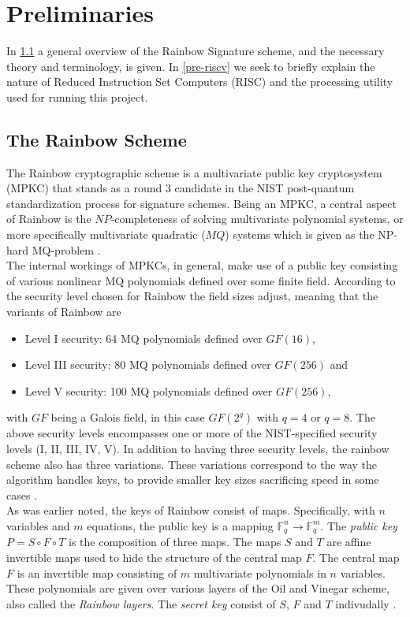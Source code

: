 \section{Preliminaries}
In \cref{rainscheme} a general overview of the Rainbow Signature scheme, and the necessary theory and terminology, is given. In \cref{pre-riscv} we seek to briefly explain the nature of Reduced Instruction Set Computers (RISC) and the processing utility used for running this project.
\subsection{The Rainbow Scheme} \label{rainscheme}
The Rainbow cryptographic scheme is a multivariate public key cryptosystem (MPKC) that stands as a round 3 candidate in the NIST post-quantum standardization process for signature schemes. Being an MPKC, a central aspect of Rainbow is the $NP$-completeness of solving multivariate polynomial systems, or more specifically multivariate quadratic ($MQ$) systems which is given as the NP-hard MQ-problem \cite{multicrypto}. 
\medskip\\
The internal workings of MPKCs, in general, make use of a public key consisting of various nonlinear MQ polynomials defined over some finite field. According to the security level chosen for Rainbow the field sizes adjust, meaning that the variants of Rainbow are 
\begin{itemize}
    \item Level I security: 64 MQ polynomials defined over $GF(16)$,
    \item Level III security: 80 MQ polynomials defined over $GF(256)$ and
    \item Level V security: 100 MQ polynomials defined over $GF(256)$,
\end{itemize}
with $GF$ being a Galois field, in this case $GF(2^q)$ with $q = 4$ or $q=8$. The above security levels encompasses one or more of the NIST-specified security levels (I, II, III, IV, V). In addition to having three security levels, the rainbow scheme also has three variations. These variations correspond to the way the algorithm handles keys, to provide smaller key sizes sacrificing speed in some cases \cite{rainbownist}.
\medskip\\
As was earlier noted, the keys of Rainbow consist of maps. Specifically, with $n$ variables and $m$ equations, the public key is a mapping $\mathbb{F}_q^n \rightarrow \mathbb{F}_q^m$. The \textit{public key} $P = S \circ F \circ T$ is the composition of three maps. The maps $S$ and $T$ are affine invertible maps used to hide the structure of the central map $F$. The central map $F$ is an invertible map consisting of $m$ multivariate polynomials in $n$ variables. These polynomials are given over various layers of the Oil and Vinegar scheme, also called the \textit{Rainbow layers}. The \textit{secret key} consist of $S$, $F$ and $T$ indivudally \cite{multicrypto}.
